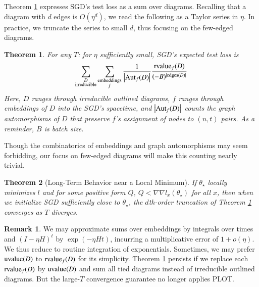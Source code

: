\documentclass{article}
\theoremstyle{plain}
\newtheorem{thm}{Theorem}
\theoremstyle{definition}
\newtheorem{rmk}{Remark}
\newcommand{\wabs}[1]{\left|#1\right|}
\newcommand{\Aut}{\text{\textnormal{Aut}}}
\newcommand{\uvalue}{\text{\textnormal{uvalue}}}
\newcommand{\rvalue}{\text{\textnormal{rvalue}}}
\newcommand{\edges}{\text{\textnormal{edges}}}
\begin{document}
        Theorem \ref{thm:resum} expresses SGD's test loss as a sum over
        diagrams.  Recalling that a diagram with $d$ edges is $O(\eta^d)$, we
        read the following as a Taylor series in $\eta$.  In
        practice, we truncate the series to small $d$, thus focusing on the
        few-edged diagrams.
        \begin{thm} \label{thm:resum}
            For any $T$: for $\eta$ sufficiently small, SGD's expected test
            loss is
            \begin{equation*} \label{eq:resum}
                \sum_{\substack{D \\ \text{irreducible}}}
                \sum_{\substack{\text{embeddings} \\ f}}
                \frac{1}{\wabs{\Aut_f(D)}}
                \frac{{\rvalue_f}(D)}{(-B)^{|\edges(D)|}}
            \end{equation*}
            Here, $D$ ranges through irreducible outlined diagrams,
            $f$ ranges through embeddings of $D$ into
            the SGD's spacetime, and $\wabs{\Aut_f(D)}$ counts the graph
            automorphisms of $D$ that preserve $f$'s assignment of nodes to
            $(n,t)$ pairs.  As a reminder, $B$ is batch size.
        \end{thm}
        Though the combinatorics of embeddings and graph automorphisms may seem
        forbidding, our focus on few-edged diagrams will make this counting
        nearly trivial.

 
        \begin{thm}[Long-Term Behavior near a Local Minimum] \label{thm:converge}
            If $\theta_\star$ locally minimizes $l$ and for some positive form
            $Q$, $Q < \nabla\nabla l_x(\theta_\star)$ for all $x$, then when we
            initialize SGD sufficiently close to $\theta_\star$, the
            $d$th-order truncation of Theorem \ref{thm:resum} converges as $T$
            diverges.
        \end{thm}

 
        \begin{rmk} \label{rmk:unresum}
            We may approximate sums over embeddings by integrals over
            times and $(I-\eta H)^t$ by $\exp(- \eta H t)$, incurring a
            multiplicative error of $1 + o(\eta)$.  We thus reduce to routine
            integration of exponentials.
            Sometimes, we may prefer $\uvalue(D)$ to $\rvalue_f(D)$ for its
            simplicity.  Theorem \ref{thm:resum} persists if we replace each
            $\rvalue_f(D)$ by $\uvalue(D)$ and sum all tied diagrams instead
            of irreducible outlined diagrams.  But the large-$T$ convergence
            guarantee no longer applies {\color{red} PLOT}.
        \end{rmk}
\end{document}
